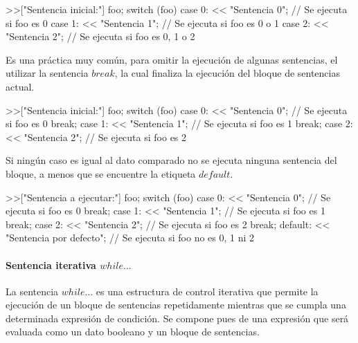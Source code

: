 \begin{myverbatim}
   >>["Sentencia inicial:"] foo;
   switch (foo) {
      case 0: 
         << "Sentencia 0"; // Se ejecuta si foo es 0
      case 1:
         << "Sentencia 1"; // Se ejecuta si foo es 0 o 1
      case 2:
         << "Sentencia 2"; // Se ejecuta si foo es 0, 1 o 2
   }
\end{myverbatim}

Es una práctica muy común, para omitir la ejecución de algunas sentencias, el utilizar la sentencia $break$, la cual finaliza la 
ejecución del bloque de sentencias actual. \\ 

\begin{myverbatim}
   >>["Sentencia inicial:"] foo;
   switch (foo) {
      case 0: 
         << "Sentencia 0"; // Se ejecuta si foo es 0
         break;
      case 1:
         << "Sentencia 1"; // Se ejecuta si foo es 1
         break;
      case 2:
         << "Sentencia 2"; // Se ejecuta si foo es 2
   }
\end{myverbatim}

Si ningún caso es igual al dato comparado no se ejecuta ninguna sentencia del bloque, a menos que se encuentre 
la etiqueta $default$. \\

\begin{myverbatim}
   >>["Sentencia a ejecutar:"] foo;
   switch (foo) {
      case 0: 
         << "Sentencia 0"; // Se ejecuta si foo es 0
         break;
      case 1:
         << "Sentencia 1"; // Se ejecuta si foo es 1
         break;
      case 2:
         << "Sentencia 2"; // Se ejecuta si foo es 2
         break;
      default:
         << "Sentencia por defecto"; // Se ejecuta si foo no es 0, 1 ni 2
   }
\end{myverbatim}



\paragraph{Sentencia iterativa $while...$} \label{sec:stmt_while}

La sentencia $while...$ es una estructura de control iterativa que permite la ejecución de un bloque de 
sentencias repetidamente mientras que se cumpla una determinada expresión de condición. Se compone pues de una expresión que será evaluada como 
un dato booleano y un bloque de sentencias. \\

